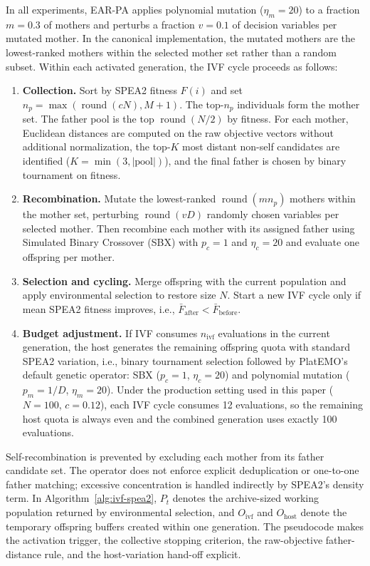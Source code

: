 \documentclass[pdflatex,sn-mathphys-ay]{sn-jnl}%
\theoremstyle{thmstyleone}%
\theoremstyle{thmstyletwo}%
\theoremstyle{thmstylethree}%
\begin{document}
In all experiments, EAR-PA applies polynomial mutation ($\eta_m=20$) to a fraction $m=0.3$ of mothers and perturbs a fraction $v=0.1$ of decision variables per mutated mother. In the canonical implementation, the mutated mothers are the lowest-ranked mothers within the selected mother set rather than a random subset. Within each activated generation, the IVF cycle proceeds as follows:
\begin{enumerate}
	\item \textbf{Collection.} Sort by SPEA2 fitness $F(i)$ and set $n_p=\max(\operatorname{round}(cN),M+1)$. The top-$n_p$ individuals form the mother set. The father pool is the top $\operatorname{round}(N/2)$ by fitness. For each mother, Euclidean distances are computed on the raw objective vectors without additional normalization, the top-$K$ most distant non-self candidates are identified ($K=\min(3,|\text{pool}|)$), and the final father is chosen by binary tournament on fitness.
	\item \textbf{Recombination.} Mutate the lowest-ranked $\operatorname{round}(m n_p)$ mothers within the mother set, perturbing $\operatorname{round}(vD)$ randomly chosen variables per selected mother. Then recombine each mother with its assigned father using Simulated Binary Crossover (SBX) with $p_c=1$ and $\eta_c=20$ and evaluate one offspring per mother.
	\item \textbf{Selection and cycling.} Merge offspring with the current population and apply environmental selection to restore size $N$. Start a new IVF cycle only if mean SPEA2 fitness improves, i.e., $\bar{F}_{\text{after}} < \bar{F}_{\text{before}}$.
	\item \textbf{Budget adjustment.} If IVF consumes $n_{\text{ivf}}$ evaluations in the current generation, the host generates the remaining offspring quota with standard SPEA2 variation, i.e., binary tournament selection followed by PlatEMO's default genetic operator: SBX ($p_c=1$, $\eta_c=20$) and polynomial mutation ($p_m=1/D$, $\eta_m=20$). Under the production setting used in this paper ($N=100$, $c=0.12$), each IVF cycle consumes 12 evaluations, so the remaining host quota is always even and the combined generation uses exactly 100 evaluations.
\end{enumerate}

Self-recombination is prevented by excluding each mother from its father candidate set. The operator does not enforce explicit deduplication or one-to-one father matching; excessive concentration is handled indirectly by SPEA2's density term. In Algorithm~\ref{alg:ivf-spea2}, $P_t$ denotes the archive-sized working population returned by environmental selection, and $O_{\text{ivf}}$ and $O_{\text{host}}$ denote the temporary offspring buffers created within one generation. The pseudocode makes the activation trigger, the collective stopping criterion, the raw-objective father-distance rule, and the host-variation hand-off explicit.
\end{document}
